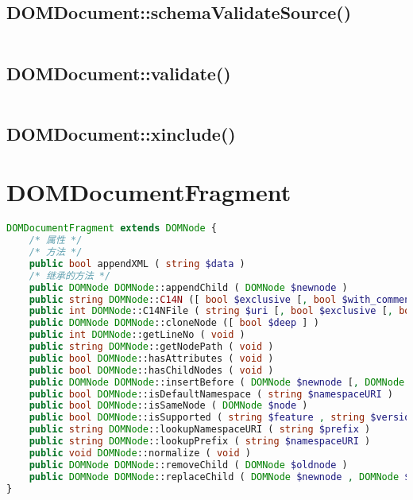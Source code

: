 \subsection{DOMDocument::schemaValidateSource()}


\begin{lstlisting}[language=PHP]

\end{lstlisting}


\subsection{DOMDocument::validate()}


\begin{lstlisting}[language=PHP]

\end{lstlisting}


\subsection{DOMDocument::xinclude()}












\section{DOMDocumentFragment}


\begin{lstlisting}[language=PHP]
DOMDocumentFragment extends DOMNode {
    /* 属性 */
    /* 方法 */
    public bool appendXML ( string $data )
    /* 继承的方法 */
    public DOMNode DOMNode::appendChild ( DOMNode $newnode )
    public string DOMNode::C14N ([ bool $exclusive [, bool $with_comments [, array $xpath [, array $ns_prefixes ]]]] )
    public int DOMNode::C14NFile ( string $uri [, bool $exclusive [, bool $with_comments [, array $xpath [, array $ns_prefixes ]]]] )
    public DOMNode DOMNode::cloneNode ([ bool $deep ] )
    public int DOMNode::getLineNo ( void )
    public string DOMNode::getNodePath ( void )
    public bool DOMNode::hasAttributes ( void )
    public bool DOMNode::hasChildNodes ( void )
    public DOMNode DOMNode::insertBefore ( DOMNode $newnode [, DOMNode $refnode ] )
    public bool DOMNode::isDefaultNamespace ( string $namespaceURI )
    public bool DOMNode::isSameNode ( DOMNode $node )
    public bool DOMNode::isSupported ( string $feature , string $version )
    public string DOMNode::lookupNamespaceURI ( string $prefix )
    public string DOMNode::lookupPrefix ( string $namespaceURI )
    public void DOMNode::normalize ( void )
    public DOMNode DOMNode::removeChild ( DOMNode $oldnode )
    public DOMNode DOMNode::replaceChild ( DOMNode $newnode , DOMNode $oldnode )
}
\end{lstlisting}

